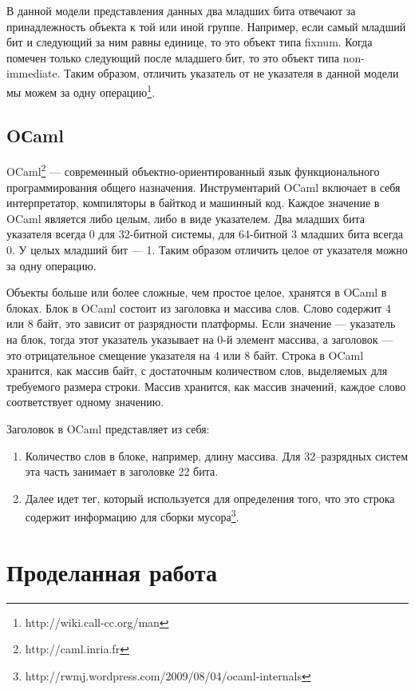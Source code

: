 В данной модели представления данных два младших бита отвечают за принадлежность объекта к той или иной 
группе. Например, если самый младший бит и следующий за ним равны единице, то это объект типа fixnum.
Когда помечен только следующий после младшего бит, то это объект типа non-immediate.
Таким образом, отличить указатель от не указателя в данной модели мы можем за одну 
операцию\footnote{http://wiki.call-cc.org/man}.

\subsection {OСaml}

OCaml\footnote{http://caml.inria.fr} --- современный объектно-ориентированный язык функционального программирования общего назначения. 
Инструментарий OCaml включает в себя интерпретатор, компиляторы в байткод и машинный код.
Каждое значение в OCaml является либо целым, либо в виде указателем.
Два младших бита указателя всегда 0 для 32-битной системы, для 64-битной 3 младших бита всегда 0. У целых младший бит --- 1. 
Таким образом отличить целое от указателя можно за одну операцию.

Объекты больше или более сложные, чем простое целое, хранятся в OСaml в блоках.
Блок в OCaml состоит из заголовка и массива слов. Слово содержит 4 или 8 байт, это зависит от разрядности платформы.
Если значение --- указатель на блок, тогда этот указатель указывает на 0-й элемент массива, а
заголовок --- это отрицательное смещение указателя на 4 или 8 байт.
Строка в OCaml хранится, как массив байт,
с достаточным количеством слов, выделяемых для требуемого размера строки.
Массив хранится, как массив значений,
каждое слово соответствует одному значению.

Заголовок в OCaml представляет из себя:
\begin{enumerate}
\item Количество слов в блоке, например, длину массива. Для 32--разрядных систем эта часть занимает в заголовке 22 бита.
\item Далее идет тег, который используется для определения того, что это строка содержит информацию для сборки мусора\footnote{http://rwmj.wordpress.com/2009/08/04/ocaml-internals}.
\end{enumerate}
 
\section {Проделанная работа}


